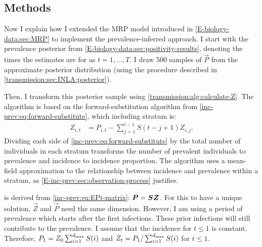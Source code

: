 \documentclass[thesis.tex]{subfiles}
\begin{document}
\subsection{Methods} \label{backcalc:sec:methods}

Now I explain how I extended the MRP model introduced in \cref{E-biology-data:sec:MRP} to implement the prevalence-inferred approach.
I start with the prevalence posterior from \cref{E-biology-data:sec:positivity-results}, denoting the times the estimates are for as $t = 1, \dots, T$.
I draw 500 samples of $\vec{P}$ from the approximate posterior distribution (using the procedure described in \cref{transmission:sec:INLA:posterior}).

Then, I transform this posterior sample using \cref{transmission:alg:calculate-Z}.
The algorithm is based on the forward-substitution algorithm from \cref{inc-prev:eq:forward-substitute}, which including stratum is:
\begin{align}
Z_{i,t}
&= P_{i,t} - \sum_{j=1}^{t-1} S(t - j + 1) Z_{i,j}.
\label{transmission:eq:forward-substitute}
\end{align}
Dividing each side of \cref{inc-prev:eq:forward-substitute} by the total number of individuals in each stratum transforms the number of prevalent individuals to prevalence and incidence to incidence proportion.
The algorithm uses a mean-field approximation to the relationship between incidence and prevalence within a stratum, as \cref{E-inc-prev:sec:observation-process} justifies.

\begin{algorithm}
    \caption{%
      Algorithm to transform 500 posterior samples posterior samples of $\vec{P}$ to posterior samples of $\vec{Z}$.
      Assumes constant incidence for $t \leq 1$ where $t = 1$ is the first day of prevalence data.
      Calculation of $Z^{(j)}_{i,t}$ is from \cref{transmission:eq:forward-substitute}.
    }
    \label{transmission:alg:calculate-Z}
\end{algorithm}

 is derived from \cref{inc-prev:eq:EPt-matrix}: $\bm{P} = \bm{S} \bm{Z}$.
For this to have a unique solution, $\vec{Z}$ and $\vec{P}$ need the same dimension.
However, I am using a period of prevalence which starts after the first infections.
These prior infections will still contribute to the prevalence.
I assume that the incidence for $t \leq 1$ is constant.
Therefore, $P_1 = Z_0 \sum_{i=1}^{d_\text{max}} S(i)$ and $Z_t = P_1 / \sum_{i=1}^{d_\text{max}} S(i)$ for $t \leq 1$.
\end{document}
